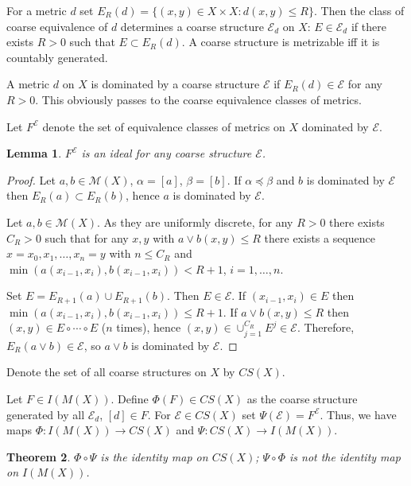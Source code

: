 \documentclass[reqno,12pt]{amsart}
\theoremstyle{plain}%
\newtheorem{thm}{Theorem}[section]
\newtheorem{lem}[thm]{Lemma}
\theoremstyle{definition}
\theoremstyle{remark}
\numberwithin{equation}{section}
\begin{document}
For a metric $d$ set $E_R(d)=\{(x,y)\in X\times X:d(x,y)\leq R\}$. Then the class of coarse equivalence of $d$ determines a coarse structure $\mathcal E_d$ on $X$: $E\in\mathcal E_d$ if there exists $R>0$ such that $E\subset E_R(d)$. A coarse structure is metrizable iff it is countably generated.

A metric $d$ on $X$ is dominated by a coarse structure $\mathcal E$ if $E_R(d)\in\mathcal E$ for any $R>0$. This obviously passes to the coarse equivalence classes of metrics.

Let $F^\mathcal E$ denote the set of equivalence classes of metrics on $X$ dominated by $\mathcal E$.

\begin{lem}
$F^\mathcal E$ is an ideal for any coarse structure $\mathcal E$.

\end{lem}
\begin{proof}
Let $a,b\in\mathcal M(X)$, $\alpha=[a]$, $\beta=[b]$. If $\alpha\preceq\beta$ and $b$ is dominated by $\mathcal E$ then $E_R(a)\subset E_R(b)$, hence $a$ is dominated by $\mathcal E$.

Let $a,b\in\mathcal M(X)$. As they are uniformly discrete, for any $R>0$ there exists $C_R>0$ such that for any $x,y$ with $a\lor b(x,y)\leq R$ there exists a sequence $x=x_0,x_1,\ldots,x_n=y$ with $n\leq C_R$ and $\min(a(x_{i-1},x_i),b(x_{i-1},x_i))<R+1$, $i=1,\ldots,n$.

Set $E=E_{R+1}(a)\cup E_{R+1}(b)$. Then $E\in\mathcal E$. If $(x_{i-1},x_i)\in E$ then $\min(a(x_{i-1},x_i),b(x_{i-1},x_i))\leq R+1$. If $a\lor b(x,y)\leq R$ then $(x,y)\in E\circ\cdots\circ E$ ($n$ times), hence $(x,y)\in\cup_{j=1}^{C_R} E^j\in \mathcal E$. Therefore, $E_R(a\lor b)\in\mathcal E$, so $a\lor b$ is dominated by $\mathcal E$.
\end{proof}

Denote the set of all coarse structures on $X$ by $CS(X)$.

Let $F\in I(M(X))$. Define $\Phi(F)\in CS(X)$ as the coarse structure generated by all $\mathcal E_d$, $[d]\in F$.
For $\mathcal E\in CS(X)$ set $\Psi(\mathcal E)=F^\mathcal E$. Thus, we have maps $\Phi:I(M(X))\to CS(X)$ and $\Psi:CS(X)\to I(M(X))$.

\begin{thm}
$\Phi\circ\Psi$ is the identity map on $CS(X)$; $\Psi\circ\Phi$ is not the identity map on $I(M(X))$.

\end{thm}
\end{document}
